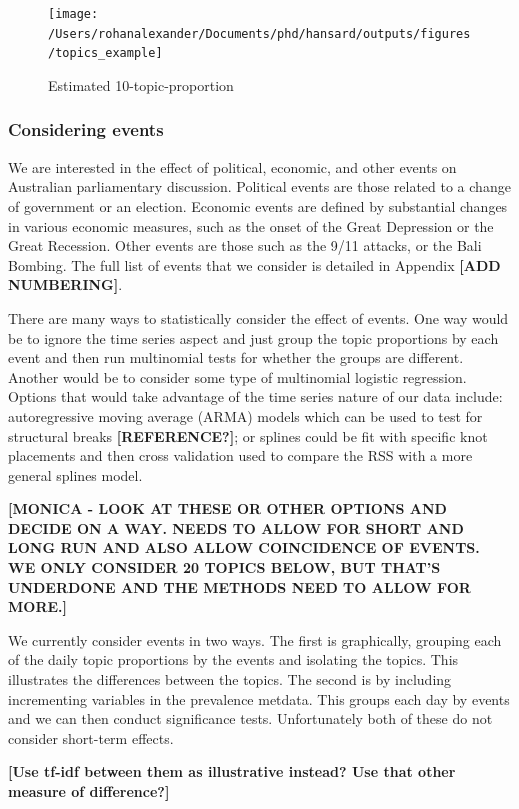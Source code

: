 \documentclass[12pt,]{article}
\theoremstyle{definition}
\theoremstyle{definition}
\theoremstyle{definition}
\theoremstyle{remark}
\begin{document}
\begin{figure}
\texttt{[image: /Users/rohanalexander/Documents/phd/hansard/outputs/figures/topics\_example]} \caption{Estimated 10-topic-proportion}\label{fig:exampletopics}
\end{figure}

\subsubsection{Considering events}\label{considering-events}

We are interested in the effect of political, economic, and other events
on Australian parliamentary discussion. Political events are those
related to a change of government or an election. Economic events are
defined by substantial changes in various economic measures, such as the
onset of the Great Depression or the Great Recession. Other events are
those such as the 9/11 attacks, or the Bali Bombing. The full list of
events that we consider is detailed in Appendix \textbf{{[}ADD
NUMBERING{]}}.

There are many ways to statistically consider the effect of events. One
way would be to ignore the time series aspect and just group the topic
proportions by each event and then run multinomial tests for whether the
groups are different. Another would be to consider some type of
multinomial logistic regression. Options that would take advantage of
the time series nature of our data include: autoregressive moving
average (ARMA) models which can be used to test for structural breaks
\textbf{{[}REFERENCE?{]}}; or splines could be fit with specific knot
placements and then cross validation used to compare the RSS with a more
general splines model.

\textbf{{[}MONICA - LOOK AT THESE OR OTHER OPTIONS AND DECIDE ON A WAY.
NEEDS TO ALLOW FOR SHORT AND LONG RUN AND ALSO ALLOW COINCIDENCE OF
EVENTS. WE ONLY CONSIDER 20 TOPICS BELOW, BUT THAT'S UNDERDONE AND THE
METHODS NEED TO ALLOW FOR MORE.{]}}

We currently consider events in two ways. The first is graphically,
grouping each of the daily topic proportions by the events and isolating
the topics. This illustrates the differences between the topics. The
second is by including incrementing variables in the prevalence metdata.
This groups each day by events and we can then conduct significance
tests. Unfortunately both of these do not consider short-term effects.

\textbf{{[}Use tf-idf between them as illustrative instead? Use that
other measure of difference?{]}}
\end{document}
